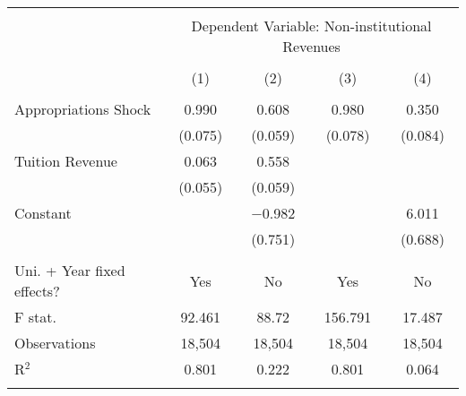 
\begin{tabular}{@{\extracolsep{5pt}}lcccc} 
\\[-1.8ex]\hline 
\hline \\[-1.8ex] 
 & \multicolumn{4}{c}{Dependent Variable: Non-institutional Revenues} \\ 
\cline{2-5} 
\\[-1.8ex] & (1) & (2) & (3) & (4)\\ 
\hline \\[-1.8ex] 
 Appropriations Shock & 0.990 & 0.608 & 0.980 & 0.350 \\ 
  & (0.075) & (0.059) & (0.078) & (0.084) \\ 
  Tuition Revenue & 0.063 & 0.558 &  &  \\ 
  & (0.055) & (0.059) &  &  \\ 
  Constant &  & $-$0.982 &  & 6.011 \\ 
  &  & (0.751) &  & (0.688) \\ 
 \hline \\[-1.8ex] 
Uni. + Year fixed effects? & Yes & No & Yes & No \\ 
F stat. & 92.461 & 88.72 & 156.791 & 17.487 \\ 
Observations & 18,504 & 18,504 & 18,504 & 18,504 \\ 
R$^{2}$ & 0.801 & 0.222 & 0.801 & 0.064 \\ 
\hline 
\hline \\[-1.8ex] 
\end{tabular} 
